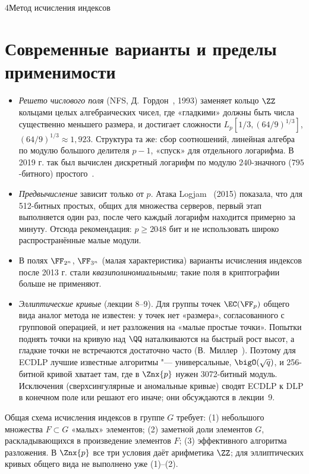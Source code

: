 \begin{lecture}{4}{Метод исчисления индексов}

\section{Современные варианты и пределы применимости}

\begin{itemize}
  \item \emph{Решето числового поля} (NFS, Д.~Гордон~\cite{gordon-nfs-dlog}, 1993) заменяет
    кольцо $\ZZ$ кольцами целых алгебраических чисел, где «гладкими» должны быть числа
    существенно меньшего размера, и достигает сложности $L_p[1/3, (64/9)^{1/3}]$,
    $(64/9)^{1/3} \approx 1{,}923$. Структура та же: сбор соотношений, линейная алгебра по модулю
    большого делителя $p - 1$, «спуск» для отдельного логарифма. В 2019 г. так был
    вычислен дискретный логарифм по модулю $240$-значного ($795$-битного) простого~\cite{boudot-240}.
  \item \emph{Предвычисление} зависит только от $p$. Атака Logjam~\cite{logjam} (2015) показала,
    что для 512-битных простых, общих для множества серверов, первый этап выполняется один раз,
    после чего каждый логарифм находится примерно за минуту. Отсюда рекомендация: $p \ge 2048$ бит и
    не использовать широко распространённые малые модули.
  \item В полях $\FF_{2^n}$, $\FF_{3^n}$ (малая характеристика) варианты исчисления индексов
    после 2013 г. стали \emph{квазиполиномиальными}; такие поля в криптографии больше
    не применяют.
  \item \emph{Эллиптические кривые} (лекции 8--9). Для группы точек $\EC(\FF_p)$ общего вида
    аналог метода не известен: у точек нет «размера», согласованного с групповой операцией,
    и нет разложения на «малые простые точки». Попытки поднять точки на кривую над $\QQ$
    наталкиваются на быстрый рост высот, а гладкие точки не встречаются достаточно часто
    (В.~Миллер~\cite{miller-ecc}). Поэтому для ECDLP лучшие известные алгоритмы "---
    универсальные, $\bigO(\sqrt q)$, и 256-битной кривой хватает там, где в $\Znx{p}$ нужен
    3072-битный модуль. Исключения (сверхсингулярные и аномальные кривые) сводят ECDLP к DLP
    в конечном поле или решают его иначе; они обсуждаются в лекции~9.
\end{itemize}

Общая схема исчисления индексов в группе $G$ требует: (1) небольшого множества $F \subset G$
«малых» элементов; (2) заметной доли элементов $G$, раскладывающихся в произведение элементов $F$;
(3) эффективного алгоритма разложения. В $\Znx{p}$ все три условия даёт арифметика $\ZZ$;
для эллиптических кривых общего вида не выполнено уже (1)--(2).


\end{lecture}

